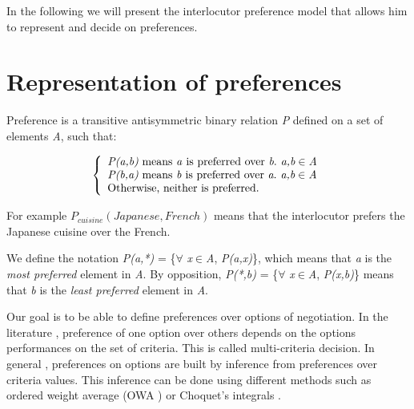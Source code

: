 \documentclass{llncs}
\begin{document}
In the following we will present the interlocutor preference model that allows him to represent and decide on preferences.

\section{Representation of preferences}

 Preference is a transitive antisymmetric binary relation \emph{P} defined on a set of elements \emph{A}, such that:
 
 \[ \left \{
     \begin{array}{l}
 	\emph{P(a,b)} $ means \emph{a}  is preferred over $\emph{b}. \emph{ a,b} \in \emph{A}\\
 	\emph{P(b,a)} $ means  \emph{b} is preferred over $\emph{a}. \emph{ a,b} \in \emph{A}\\
 $Otherwise, neither is preferred. $\\
     \end{array}
    \right .\]

For example $P_{cuisine} (Japanese, French)$ means that the interlocutor prefers the Japanese cuisine over the French. 

\par  We define the notation \emph{P(a,*)}  = \{$\forall$ \emph{x}$\in$\emph{A}, \emph{P(a,x)}\}, which means that \emph{a} is the \textit{most preferred} element in \emph{A}. 
By opposition, \emph{P(*,b)} = \{$\forall$ \emph{x}$\in$\emph{A}, \emph{P(x,b)}\} means that \emph{b} is the \textit{least preferred} element in \emph{A}.


 
\par Our goal is to be able to define preferences over options of negotiation. 
In the literature \cite{dodgson2009multi}, preference of one option over others depends on the options performances on the set of criteria. This is called multi-criteria decision. In general \cite{dodgson2009multi}, preferences on options are built by inference from preferences over criteria values. This inference can be done using different methods such as ordered weight average (OWA \cite{yager2012ordered}) or Choquet's integrals \cite{chouquet1953}.
\end{document}
